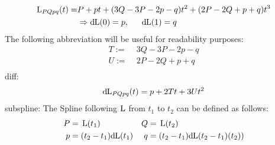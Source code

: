     $$\begin{aligned}
        \operatorname{L}_{PQpq}(t) =& P + pt + (3Q-3P-2p-q)t^2 + (2P-2Q+p+q)t^3 \\
        &\Rightarrow {\rm d}\hspace{-2pt}\operatorname{L}(0) = p,\phantom{--} {\rm d}\hspace{-2pt}\operatorname{L}(1) = q \\
    \end{aligned}$$
    The following abbreviation will be useful for readability purposes:
    $$\begin{aligned}
        T :=&\phantom{.} 3Q-3P-2p-q \\
        U :=&\phantom{.} 2P-2Q+p+q \\
    \end{aligned}$$
    diff:
    $$\begin{aligned}
        {\rm d}\hspace{-2pt}\operatorname{L}_{PQpq}(t) = p + 2Tt + 3Ut^2 \\
    \end{aligned}$$
    subspline:
    The Spline following $\operatorname{L}$ from $t_1$ to $t_2$ can be defined as follows:
    $$\begin{aligned}
        P =&\phantom{.} \operatorname{L}(t_1) & Q =&\phantom{.} \operatorname{L}(t_2) \\
        p =&\phantom{.} (t_2-t_1){\rm d}\hspace{-2pt}\operatorname{L}(t_1) & q =&\phantom{.} (t_2-t_1){\rm d}\hspace{-2pt}\operatorname{L}(t_2-t_1)(t_2)) \\
    \end{aligned}$$
